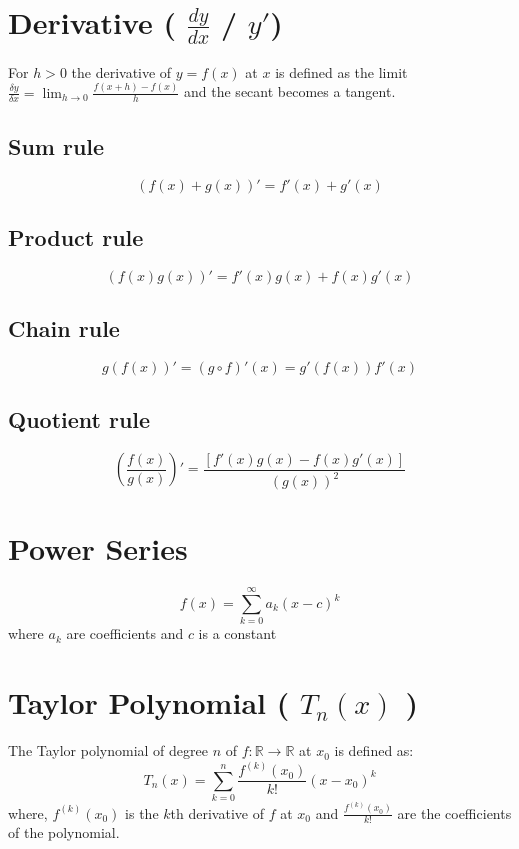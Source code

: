 \section{Derivative ( $\displaystyle\frac{dy}{dx}$ / $y'$)}\label{Derivative}

For $h > 0$ the derivative of $y = f(x)$ at $x$ is defined as the limit \( \displaystyle\frac{\delta y}{\delta x} = \lim_{h\rightarrow 0}\displaystyle\frac{f(x + h) - f(x)}{h} \) and the secant becomes a tangent.

\subsection{Sum rule}
\[
    (f(x) + g(x))' = f'(x) + g'(x)
\]

\subsection{Product rule}
\[
    (f(x)g(x))' = f'(x)g(x) + f(x)g'(x)
\]

\subsection{Chain rule}
\[
    g(f(x))' = (g \circ f)'(x) = g'(f(x))f'(x)
\]

\subsection{Quotient rule}
\[
    \left( \displaystyle\frac{f(x)}{g(x)} \right)' = \displaystyle\frac{[f'(x)g(x) - f(x)g'(x)]}{(g(x))^2}
\]

\section{Power Series}\label{Power Series}
\[
    f(x) = \sum_{k=0}^{\infty} a_k (x-c)^k
\]
where $a_k$ are coefficients and $c$ is a constant

\section{Taylor Polynomial ( $T_n(x)$ )}\label{Taylor Polynomial}
The Taylor polynomial of degree $n$ of $f : \mathbb{R} \rightarrow \mathbb{R}$ at $x_0$ is defined as: 
\[
    T_n(x) = \sum_{k=0}^{n}\displaystyle\frac{f^{(k)}(x_0)}{k!}(x-x_0)^k
\]
where, $f^{(k)}(x_0)$ is the $k$th derivative of $f$ at $x_0$ and $\displaystyle\frac{f^{(k)}(x_0)}{k!}$ are the coefficients of the polynomial.


